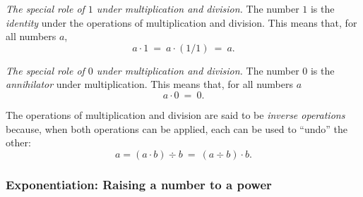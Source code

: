 {\em The special role of $1$ under multiplication and division.}
%
The number $1$ is the {\it identity} under the operations of
multiplication and division.
%
This means that, for all numbers $a$,
\[ a \cdot 1 \ = \ a \cdot (1/1) \ = \ a. \]

{\em The special role of $0$ under multiplication and division.}
%
The number $0$ is the {\it annihilator} under
multiplication. This means that, for
all numbers $a$
\[ a \cdot 0 \ = \ 0. \]

The operations of multiplication and division are said to be {\em
  inverse operations}  because, when both operations can be applied, each
can be used to ``undo'' the other:
\[ a = (a \cdot b) \div b \ = \ (a \div b) \cdot b.  \]

\subsubsection{Exponentiation: Raising a number to a power}
\label{sec:exponentiation}

